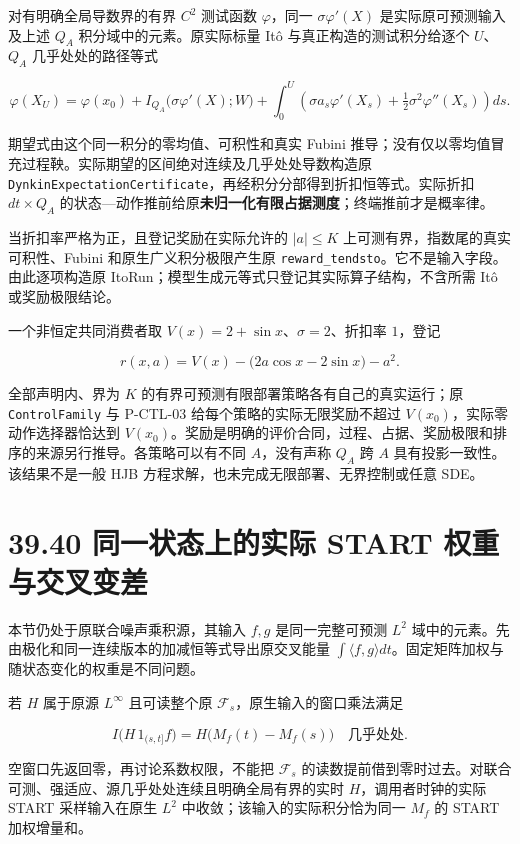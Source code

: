 \documentclass[
  11pt,
  oneside]{book}
\begin{document}
对有明确全局导数界的有界 \(C^2\) 测试函数 \(\varphi\)，同一 \(\sigma\varphi'(X)\) 是实际原可预测输入及上述 \(Q_A\) 积分域中的元素。原实际标量 Itô 与真正构造的测试积分给逐个 \(U\)、\(Q_A\) 几乎处处的路径等式

\[\varphi(X_U)=\varphi(x_0)+I_{Q_A}\bigl(\sigma\varphi'(X);W\bigr)
+\int_0^U\left(\sigma a_s\varphi'(X_s)+\tfrac12\sigma^2\varphi''(X_s)\right)ds.\]

期望式由这个同一积分的零均值、可积性和真实 Fubini 推导；没有仅以零均值冒充过程鞅。实际期望的区间绝对连续及几乎处处导数构造原 \nolinkurl{DynkinExpectationCertificate}，再经积分分部得到折扣恒等式。实际折扣 \(dt\times Q_A\) 的状态---动作推前给原\textbf{未归一化有限占据测度}；终端推前才是概率律。

当折扣率严格为正，且登记奖励在实际允许的 \(|a|\le K\) 上可测有界，指数尾的真实可积性、Fubini 和原生广义积分极限产生原 \nolinkurl{reward_tendsto}。它不是输入字段。由此逐项构造原 ItoRun；模型生成元等式只登记其实际算子结构，不含所需 Itô 或奖励极限结论。

一个非恒定共同消费者取 \(V(x)=2+\sin x\)、\(\sigma=2\)、折扣率 \(1\)，登记

\[r(x,a)=V(x)-\bigl(2a\cos x-2\sin x\bigr)-a^2.\]

全部声明内、界为 \(K\) 的有界可预测有限部署策略各有自己的真实运行；原 \nolinkurl{ControlFamily} 与 P-CTL-03 给每个策略的实际无限奖励不超过 \(V(x_0)\)，实际零动作选择器恰达到 \(V(x_0)\)。奖励是明确的评价合同，过程、占据、奖励极限和排序的来源另行推导。各策略可以有不同 \(A\)，没有声称 \(Q_A\) 跨 \(A\) 具有投影一致性。该结果不是一般 HJB 方程求解，也未完成无限部署、无界控制或任意 SDE。

\section{39.40 同一状态上的实际 START 权重与交叉变差}\label{ux540cux4e00ux72b6ux6001ux4e0aux7684ux5b9eux9645-start-ux6743ux91cdux4e0eux4ea4ux53c9ux53d8ux5dee}

本节仍处于原联合噪声乘积源，其输入 \(f,g\) 是同一完整可预测 \(L^2\) 域中的元素。先由极化和同一连续版本的加减恒等式导出原交叉能量 \(\int\langle f,g\rangle dt\)。固定矩阵加权与随状态变化的权重是不同问题。

若 \(H\) 属于原源 \(L^\infty\) 且可读整个原 \(\mathcal F_s\)，原生输入的窗口乘法满足

\[I\bigl(H\,1_{(s,t]} f\bigr)=H\bigl(M_f(t)-M_f(s)\bigr)
\quad\text{几乎处处}.\]

空窗口先返回零，再讨论系数权限，不能把 \(\mathcal F_s\) 的读数提前借到零时过去。对联合可测、强适应、源几乎处处连续且明确全局有界的实时 \(H\)，调用者时钟的实际 START 采样输入在原生 \(L^2\) 中收敛；该输入的实际积分恰为同一 \(M_f\) 的 START 加权增量和。
\end{document}
